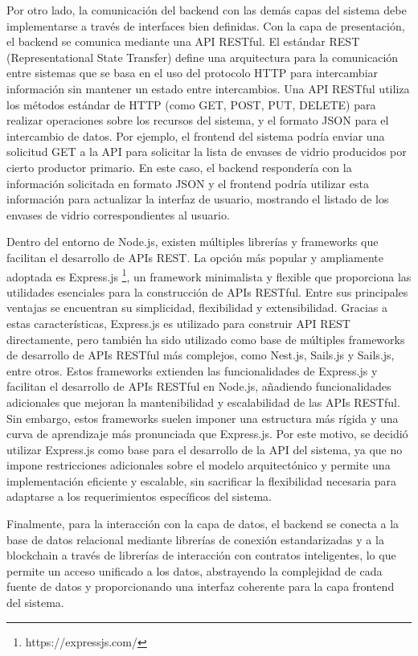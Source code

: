 Por otro lado, la comunicación del backend con las demás capas del sistema debe implementarse a través de interfaces bien definidas. Con la capa de presentación, el backend se comunica mediante una API RESTful. El estándar REST (Representational State Transfer) define una arquitectura para la comunicación entre sistemas que se basa en el uso del protocolo HTTP para intercambiar información sin mantener un estado entre intercambios. Una API RESTful utiliza los métodos estándar de HTTP (como GET, POST, PUT, DELETE) para realizar operaciones sobre los recursos del sistema, y el formato JSON para el intercambio de datos. Por ejemplo, el frontend del sistema podría enviar una solicitud GET a la API para solicitar la lista de envases de vidrio producidos por cierto productor primario. En este caso, el backend respondería con la información solicitada en formato JSON y el frontend podría utilizar esta información para actualizar la interfaz de usuario, mostrando el listado de los envases de vidrio correspondientes al usuario.

Dentro del entorno de Node.js, existen múltiples librerías y frameworks que facilitan el desarrollo de APIs REST. La opción más popular y ampliamente adoptada es Express.js \footnote{https://expressjs.com/}, un framework minimalista y flexible que proporciona las utilidades esenciales para la construcción de APIs RESTful. Entre sus principales ventajas se encuentran su simplicidad, flexibilidad y extensibilidad. Gracias a estas características, Express.js es utilizado para construir API REST directamente, pero también ha sido utilizado como base de múltiples frameworks de desarrollo de APIs RESTful más complejos, como Nest.js, Sails.js y Sails.js, entre otros. Estos frameworks extienden las funcionalidades de Express.js y facilitan el desarrollo de APIs RESTful en Node.js, añadiendo funcionalidades adicionales que mejoran la mantenibilidad y escalabilidad de las APIs RESTful. Sin embargo, estos frameworks suelen imponer una estructura más rígida y una curva de aprendizaje más pronunciada que Express.js. Por este motivo, se decidió utilizar Express.js como base para el desarrollo de la API del sistema, ya que no impone restricciones adicionales sobre el modelo arquitectónico y permite una implementación eficiente y escalable, sin sacrificar la flexibilidad necesaria para adaptarse a los requerimientos específicos del sistema.

Finalmente, para la interacción con la capa de datos, el backend se conecta a la base de datos relacional mediante librerías de conexión estandarizadas y a la blockchain a través de librerías de interacción con contratos inteligentes, lo que permite un acceso unificado a los datos, abstrayendo la complejidad de cada fuente de datos y proporcionando una interfaz coherente para la capa frontend del sistema.

